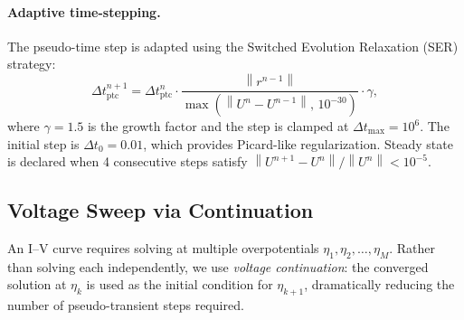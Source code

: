 \documentclass[11pt,a4paper]{article}
\newcommand{\norm}[1]{\left\lVert #1 \right\rVert}
\begin{document}
\paragraph{Adaptive time-stepping.}
The pseudo-time step is adapted using the Switched Evolution Relaxation
(SER) strategy:
\begin{equation}\label{eq:SER}
  \Delta t_{\mathrm{ptc}}^{n+1}
  = \Delta t_{\mathrm{ptc}}^n \cdot
    \frac{\norm{r^{n-1}}}{\max(\norm{U^n - U^{n-1}},\, 10^{-30})}
    \cdot \gamma,
\end{equation}
where $\gamma = 1.5$ is the growth factor and the step is clamped at
$\Delta t_{\max} = 10^6$. The initial step is
$\Delta t_0 = 0.01$, which provides Picard-like regularization. Steady
state is declared when 4 consecutive steps satisfy
$\norm{U^{n+1}-U^n}/\norm{U^n} < 10^{-5}$.

\subsection{Voltage Sweep via Continuation}\label{sec:vsweep}

An I--V curve requires solving at multiple overpotentials
$\eta_1, \eta_2, \ldots, \eta_M$. Rather than solving each independently,
we use \emph{voltage continuation}: the converged solution at $\eta_k$ is
used as the initial condition for $\eta_{k+1}$, dramatically reducing the
number of pseudo-transient steps required.
\end{document}
